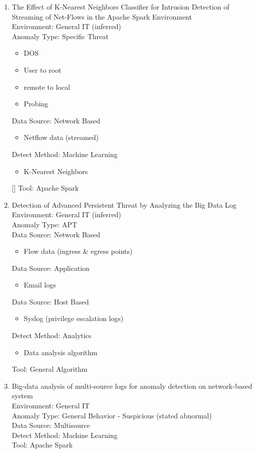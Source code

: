 \documentclass[10pt]{IEEEtran}
\begin{document}
\begin{enumerate}
    \item 
    The Effect of K-Nearest Neighbors Classifier for Intrusion Detection of Streaming of Net-Flows in the Apache Spark Environment\cite{thevar2017effect} \\
    Environment: General IT (inferred) \\
    Anomaly Type: Specific Threat
    \begin{itemize}
        \item DOS
        \item User to root
        \item remote to local
        \item Probing
    \end{itemize} 
    Data Source: Network Based
    \begin{itemize}
        \item Netflow data (streamed)
    \end{itemize} 
    Detect Method: Machine Learning
    \begin{itemize}
        \item K-Nearest Neighbors
    \end{itemize}[]
    Tool: Apache Spark 
    
    
    \item 
    Detection of Advanced Persistent Threat by Analyzing the Big Data Log\cite{kim2013detection}\\
    Environment: General IT (inferred)\\
    Anomaly Type: APT  \\
    Data Source: Network Based
    \begin{itemize}
        \item Flow data (ingress \& egress points)
    \end{itemize}
    Data Source: Application
    \begin{itemize}
        \item Email logs
    \end{itemize}
    Data Source: Host Based
    \begin{itemize}
        \item Syslog (privilege escalation logs)
    \end{itemize}
    Detect Method: Analytics
    \begin{itemize}
        \item Data analysis algorithm
    \end{itemize}
    Tool: General Algorithm
    
    \item 
    Big-data analysis of multi-source logs for anomaly detection on network-based system\cite{jia2017big}\\
    Environment: General IT \\
    Anomaly Type: General Behavior - Suspicious (stated abnormal)\\ 
    Data Source: Multisource\\ 
    Detect Method: Machine Learning\\ 
    Tool: Apache Spark 
    

\end{enumerate}
\end{document}
